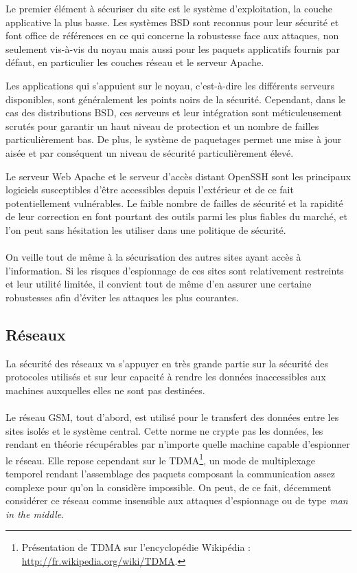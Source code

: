 \documentclass[a4paper, 11pt, final]{article}
\begin{document}
Le premier élément à sécuriser du site est le système d'exploitation,
la couche applicative la plus basse. Les systèmes BSD sont reconnus
pour leur sécurité et font office de références en ce qui concerne la
robustesse face aux attaques, non seulement vis-à-vis du
noyau mais aussi pour les paquets applicatifs fournis par défaut, en
particulier les couches réseau et le serveur Apache.

Les applications qui s'appuient sur le noyau, c'est-à-dire les
différents serveurs disponibles, sont généralement les points noirs de
la sécurité. Cependant, dans le cas des distributions BSD, ces
serveurs et leur intégration sont méticuleusement scrutés pour
garantir un haut niveau de protection et un nombre de failles
particulièrement bas. De plus, le système de paquetages permet une
mise à jour aisée et par conséquent un niveau de sécurité
particulièrement élevé.

Le serveur Web Apache et le serveur d'accès distant OpenSSH sont les
principaux logiciels susceptibles d'être accessibles depuis
l'extérieur et de ce fait potentiellement vulnérables. Le faible
nombre de failles de sécurité et la rapidité de leur correction en
font pourtant des outils parmi les plus fiables du marché, et l'on
peut sans hésitation les utiliser dans une politique de sécurité.

\paragraph{}
On veille tout de même à la sécurisation des autres sites ayant accès
à l'information. Si les risques d'espionnage de ces sites sont
relativement restreints et leur utilité limitée, il convient tout de
même d'en assurer une certaine robustesses afin d'éviter les attaques
les plus courantes.

\subsection{Réseaux}
La sécurité des réseaux va s'appuyer en très grande partie sur la
sécurité des protocoles utilisés et sur leur capacité à rendre les
données inaccessibles aux machines auxquelles elles ne sont pas
destinées.

\paragraph{}
Le réseau GSM, tout d'abord, est utilisé pour le transfert des données
entre les sites isolés et le système central. Cette norme ne crypte
pas les données, les rendant en théorie récupérables par n'importe
quelle machine capable d'espionner le réseau. Elle repose cependant
sur le TDMA\footnote{Présentation de TDMA sur l'encyclopédie Wikipédia
: \url{http://fr.wikipedia.org/wiki/TDMA}.}, un mode de multiplexage
temporel rendant l'assemblage des paquets composant la communication
assez complexe pour qu'on la considère impossible. On peut, de ce
fait, décemment considérer ce réseau comme insensible aux attaques
d'espionnage ou de type \emph{man in the middle}.
\end{document}
